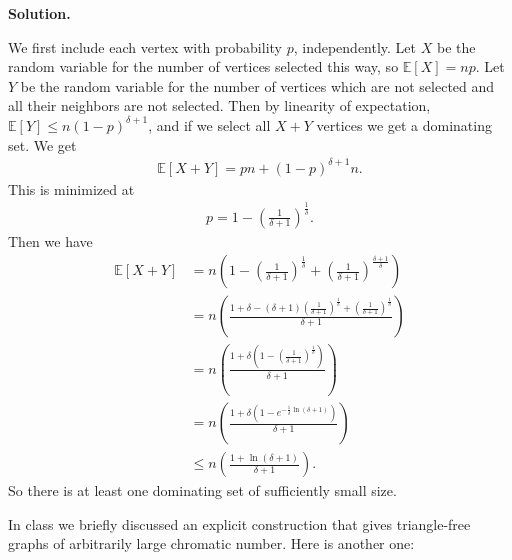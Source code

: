 \documentclass[11pt,letterpaper]{article}
\theoremstyle{definition}
\newcommand{\EE}{\mathbb{E}}
\newcommand{\solution}{\medskip\noindent\textbf{Solution.}\par\medskip}
\begin{document}
\solution

We first include each vertex with probability $p$, independently.
Let $X$ be the random variable for the number of vertices selected this way, so $\EE[X] = np$.
Let $Y$ be the random variable for the number of vertices which are not selected and all their neighbors are not selected.
Then by linearity of expectation, $\EE[Y] \leq n(1-p)^{\delta+1}$, and if we select all $X+Y$ vertices we get a dominating set.
We get
\begin{align*}
    \EE[X+Y] = pn + (1-p)^{\delta+1}n.
\end{align*}
This is minimized at 
\begin{align*}
    p = 1 - \left(\frac{1}{\delta+1}\right)^\frac{1}{\delta}.
\end{align*}
Then we have 
\begin{align*}
    \EE[X+Y]&= n\left(1-\left(\frac{1}{\delta+1}\right)^\frac{1}{\delta} + \left(\frac{1}{\delta+1}\right)^\frac{\delta+1}{\delta}\right)\\
    &= n\left(\frac{1+\delta - (\delta+1)\left(\frac{1}{\delta+1}\right)^\frac{1}{\delta} + \left(\frac{1}{\delta+1}\right)^\frac{1}{\delta}}{\delta+1}\right)\\
    &= n\left(\frac{1+\delta\left(1-\left(\frac{1}{\delta+1}\right)^\frac{1}{\delta}\right)}{\delta+1}\right) \\
    &= n\left(\frac{1+\delta\left(1-e^{-\frac{1}{\delta}\ln(\delta+1)}\right)}{\delta+1}\right) \\
    &\leq n\left(\frac{1+\ln(\delta+1)}{\delta+1}\right).
\end{align*}
So there is at least one dominating set of sufficiently small size.

\noindent In class we briefly discussed an explicit construction that gives triangle-free graphs of arbitrarily large chromatic number. Here is another one:
\end{document}
